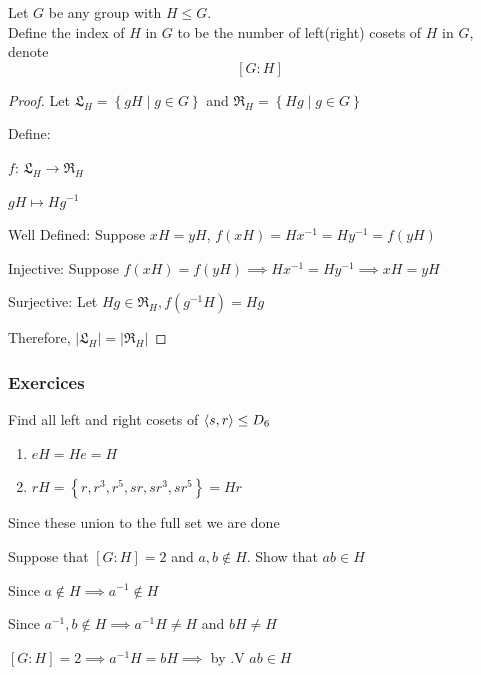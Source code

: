 \begin{definition}
    Let $G$ be any group with $H \leq G$.\\
    Define the index of $H$ in $G$ to be the number of left(right) cosets of $H$ in $G$, denote \[\left[ G:H \right]\]
\end{definition}


\begin{proof}
    Let $\mathfrak{L}_H=\left\{ gH \mid g\in G \right\}$ and $\mathfrak{R}_H=\left\{ Hg \mid g\in G \right\}$

    Define: 
    
    $f$: $\mathfrak{L}_H \rightarrow \mathfrak{R}_H$
    
    $gH \mapsto Hg^{-1}$

    Well Defined: Suppose $xH=yH$, $f(xH)=Hx^{-1}=Hy^{-1}=f(yH)$
    
    Injective: Suppose $f(xH)=f(yH)\implies Hx^{-1}=Hy^{-1}\implies xH=yH$

    Surjective: Let $Hg \in \mathfrak{R}_H, f(g^{-1}H)=Hg$
    
    Therefore, $|\mathfrak{L}_H| = |\mathfrak{R}_H|$
\end{proof}

\newpage
\subsubsection{Exercices}

\begin{example}
    Find all left and right cosets of $\left\langle s,r \right\rangle\leq D_6$

    \begin{enumerate}
        \item $eH=He=H$
        \item $rH=\left\{ r,r^3,r^5,sr,sr^3,sr^5 \right\}=Hr$
    \end{enumerate}

    Since these union to the full set we are done
\end{example}

\begin{example}
    Suppose that $[G:H]=2$ and $a,b \notin H$. Show that $ab\in H$

    Since $a \notin H \implies a^{-1} \notin H$

    Since $a^{-1},b \notin H \implies a^{-1}H\neq H$ and $bH \neq H$

    $[G:H]=2 \implies a^{-1}H=bH \implies$ by .V $ab\in H$
\end{example}